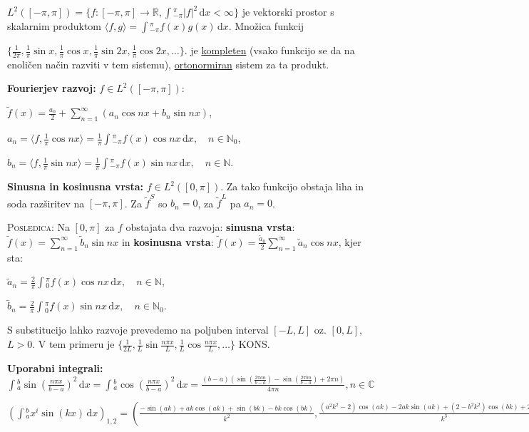 \documentclass[10pt,a4paper]{amsart}
\theoremstyle{definition} %
\theoremstyle{plain} %
\newcommand{\dx}{\ensuremath{\,\mathrm{d}x}}
\let\oldint\int
\renewcommand{\int}{\oldint \!}
\newcommand{\R}{\mathbb R}
\newcommand{\N}{\mathbb N}
\newcommand{\C}{\mathbb C}
\begin{document}
$L^2([-\pi,\pi]) = \{f:[-\pi,\pi]\longrightarrow \R, \int_{-\pi}^\pi |f|^2
\dx < \infty \}$ je vektorski prostor s skalarnim produktom $\langle f, g\rangle =
\int_{-\pi}^\pi f(x)g(x)\dx$. Množica funkcij

  $\{\frac{1}{2\pi},
  \frac{1}{\pi}\sin{x},\frac{1}{\pi}\cos{x},\frac{1}{\pi}\sin{2x},\frac{1}{\pi}\cos{2x},\ldots
\}$. je \underline{kompleten} (vsako funkcijo se da na enoličen način razviti v
tem sistemu),  \underline{ortonormiran} sistem za ta produkt.

\textbf{Fourierjev razvoj:} $f \in L^2([-\pi,\pi])$:

$\tilde{f}(x) = \frac{a_0}{2} + \sum_{n=1}^{\infty}(a_n\cos{nx} + b_n\sin{nx})$,

$a_n = \langle f,\frac{1}{\pi}\cos{nx} \rangle =
\frac{1}{\pi}\int_{-\pi}^{\pi}f(x)\cos{nx}\dx, \quad n \in \N_0$,

$b_n = \langle f,\frac{1}{\pi}\sin{nx} \rangle =
\frac{1}{\pi}\int_{-\pi}^{\pi}f(x)\sin{nx}\dx, \quad n \in \N$.

\textbf{Sinusna in kosinusna vrsta:} $f \in L^2([0,\pi])$. Za tako funkcijo
obstaja liha in soda razširitev na $[-\pi,\pi]$. Za $\tilde{f}^S$ so $b_n = 0$,
za $\tilde{f}^L$ pa $a_n = 0$.

\textsc{Posledica:} Na $[0,\pi]$ za $f$ obstajata dva razvoja: \textbf{sinusna
vrsta}: $\tilde{f}(x) =  \sum_{n=1}^{\infty} \tilde{b}_n\sin{nx}$ in
\textbf{kosinusna vrsta}:  $\tilde{f}(x) =
\frac{\tilde{a}_0}{2}\sum_{n=1}^{\infty}\tilde{a}_n\cos{nx}$, kjer sta:

$\tilde{a}_n = \frac{2}{\pi}\int_0^{\pi}f(x)\cos{nx}\dx, \quad n \in \N$,

$\tilde{b}_n = \frac{2}{\pi}\int_0^{\pi}f(x)\sin{nx}\dx, \quad n \in \N_0$.

S substitucijo lahko razvoje prevedemo na poljuben interval $[-L,L]$ oz.
$[0,L]$, $L > 0$. V tem primeru je $\{\frac{1}{2L}, \frac{1}{L}\sin{\frac{n\pi
x}{L}},\frac{1}{L}\cos{\frac{n\pi x}{L}},\ldots \}$ KONS.

\textbf{Uporabni integrali:}
$\int_a^b \sin(\frac{n\pi x}{b-a})^2 \dx = \int_a^b \cos(\frac{n\pi x}{b-a})^2 \dx =
\frac{(b-a) \left(\sin \left(\frac{2 \pi  a n}{b-a}\right)-\sin \left(\frac{2
\pi  b n}{b-a}\right)+2 \pi  n\right)}{4 \pi  n}, n \in \C$

$(\int_a^bx^i \sin(kx)\dx)_{1,2} = (\frac{-\sin (a k)+a k \cos (a k)+\sin (b k)-b k \cos (b k)}{k^2},\frac{(a^2 k^2-2) \cos (a k)-2 a k \sin (a k)+(2-b^2 k^2) \cos (b k)+2 b k \sin (b k)}{k^3})$
\end{document}
